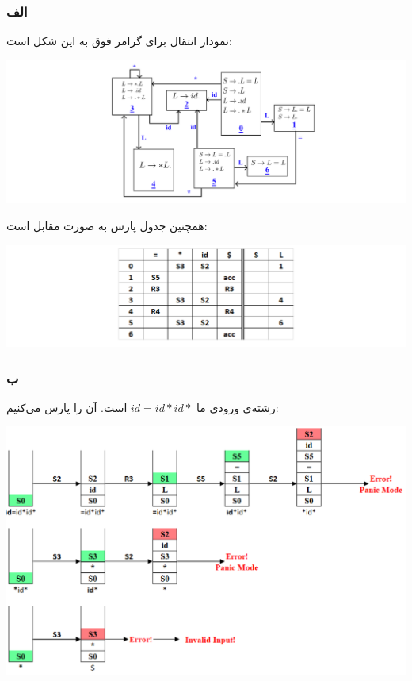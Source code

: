\subsubsection*{الف}

نمودار انتقال برای گرامر فوق به این شکل است:

\qquad\qquad\qquad\qquad\qquad\includegraphics[width=1\linewidth]{figs/7.png}

همچنین جدول پارس به صورت مقابل است:

\quad\qquad\qquad\includegraphics[width=1\linewidth]{figs/8.png}

\subsubsection*{ب}

رشته‌ی ورودی ما 
$id=id*id*$
است. آن را پارس می‌کنیم:
\setLTR

\quad\quad\qquad\qquad\includegraphics[width=0.8\linewidth]{figs/9.png}


\setRTL